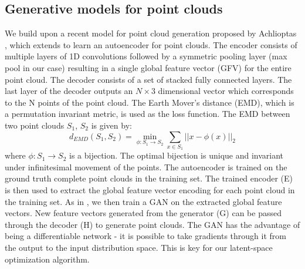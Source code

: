 \documentclass[10pt,twocolumn,letterpaper]{article}
\begin{document}
\subsection{Generative models for point clouds}
 We build upon a recent model for point cloud generation proposed by Achlioptas \etal \cite{latentgan}, which extends \cite{pnet} to learn an autoencoder for point clouds. The encoder consists of multiple layers of 1D convolutions followed by a symmetric pooling layer (max pool in our case) resulting in a single global feature vector (GFV) for the entire point cloud. The decoder consists of a set of stacked fully connected layers. The last layer of the decoder outputs an $N\times3$ dimensional vector which corresponds to the N points of the point cloud. The Earth Mover's distance (EMD), which is a permutation invariant metric, is used as the loss function. The EMD between two point clouds $S_1$, $S_2$ is given by:
\begin{equation}\label{eq:EMD}
    d_{EMD}(S_1, S_2) = \min_{\phi:S_1 \rightarrow S_2} \sum_{x \in S_1} {|| x - \phi(x)||_2}
\end{equation}
where $\phi:S_1 \rightarrow S_2$ is a bijection. The optimal bijection is unique and invariant under infinitesimal movement of the points.
The autoencoder is trained on the ground truth complete point clouds in the training set. The trained encoder (E) is then used to extract the global feature vector encoding for each point cloud in the training set. As in \cite{latentgan}, we then train a GAN on the extracted global feature vectors. New feature vectors generated from the generator (G) can be passed through the decoder (H) to generate point clouds. The GAN has the advantage of being a differentiable network - it is possible to take gradients through it from the output to the input distribution space. This is key for our latent-space optimization algorithm.
\end{document}

